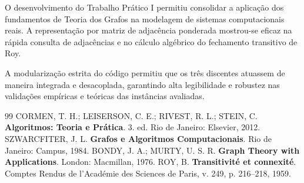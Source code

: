 \documentclass[12pt,a4paper]{article}
\begin{document}
O desenvolvimento do Trabalho Prático I permitiu consolidar a aplicação dos fundamentos de Teoria dos Grafos na modelagem de sistemas computacionais reais. A representação por matriz de adjacência ponderada mostrou-se eficaz na rápida consulta de adjacências e no cálculo algébrico do fechamento transitivo de Roy.

A modularização estrita do código permitiu que os três discentes atuassem de maneira integrada e desacoplada, garantindo alta legibilidade e robustez nas validações empíricas e teóricas das instâncias avaliadas.

\begin{thebibliography}{99}
     CORMEN, T. H.; LEISERSON, C. E.; RIVEST, R. L.; STEIN, C. \textbf{Algoritmos: Teoria e Prática}. 3. ed. Rio de Janeiro: Elsevier, 2012.
     SZWARCFITER, J. L. \textbf{Grafos e Algoritmos Computacionais}. Rio de Janeiro: Campus, 1984.
     BONDY, J. A.; MURTY, U. S. R. \textbf{Graph Theory with Applications}. London: Macmillan, 1976.
     ROY, B. \textbf{Transitivité et connexité}. Comptes Rendus de l'Académie des Sciences de Paris, v. 249, p. 216--218, 1959.
\end{thebibliography}
\end{document}
